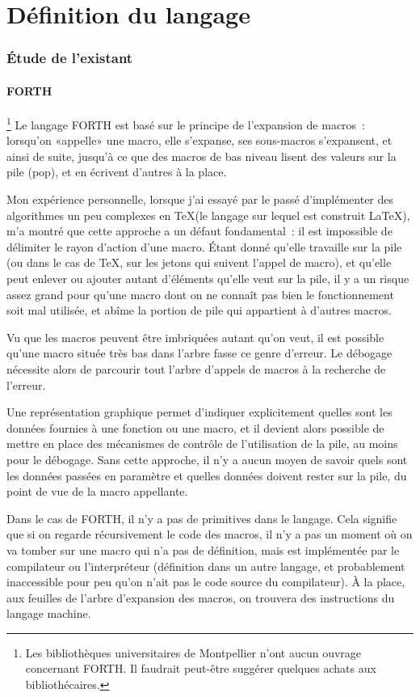 \documentclass{article}
\begin{document}
\part{Définition du langage}

\section{Étude de l'existant}

\subsection{FORTH}\footnote{Les bibliothèques universitaires de Montpellier n'ont aucun ouvrage concernant FORTH. Il faudrait peut-être suggérer quelques achats aux bibliothécaires.}
Le langage FORTH est basé sur le principe de l'expansion de macros~: lorsqu'on «appelle» une macro, elle s'expanse, ses sous-macros
s'expansent, et ainsi de suite, jusqu'à ce que des macros de bas niveau lisent des valeurs sur la pile (pop), et en écrivent d'autres à la
place.

Mon expérience personnelle, lorsque j'ai essayé par le passé d'implémenter des algorithmes un peu complexes en \TeX (le langage sur
lequel est construit \LaTeX), m'a montré que cette approche a un défaut fondamental~: il est impossible de délimiter le rayon d'action d'une
macro. Étant donné qu'elle travaille sur la pile (ou dans le cas de \TeX, sur les jetons qui suivent l'appel de macro), et qu'elle peut
enlever ou ajouter autant d'éléments qu'elle veut sur la pile, il y a un risque assez grand pour qu'une macro dont on ne connaît pas bien le
fonctionnement soit mal utilisée, et abîme la portion de pile qui appartient à d'autres macros.

Vu que les macros peuvent être imbriquées autant qu'on veut, il est possible qu'une macro située très bas dans l'arbre fasse ce genre
d'erreur. Le débogage nécessite alors de parcourir tout l'arbre d'appels de macros à la recherche de l'erreur.

Une représentation graphique permet d'indiquer explicitement quelles sont les données fournies à une fonction ou une macro, et il devient
alors possible de mettre en place des mécanismes de contrôle de l'utilisation de la pile, au moins pour le débogage. Sans cette approche, il
n'y a aucun moyen de savoir quels sont les données passées en paramètre et quelles données doivent rester sur la pile, du point de vue de la
macro appellante.

Dans le cas de FORTH, il n'y a pas de primitives dans le langage. Cela signifie que si on regarde récursivement le code des macros, il n'y a
pas un moment où on va tomber sur une macro qui n'a pas de définition, mais est implémentée par le compilateur ou l'interpréteur (définition
dans un autre langage, et probablement inaccessible pour peu qu'on n'ait pas le code source du compilateur). À la place, aux feuilles de
l'arbre d'expansion des macros, on trouvera des instructions du langage machine.
\end{document}

